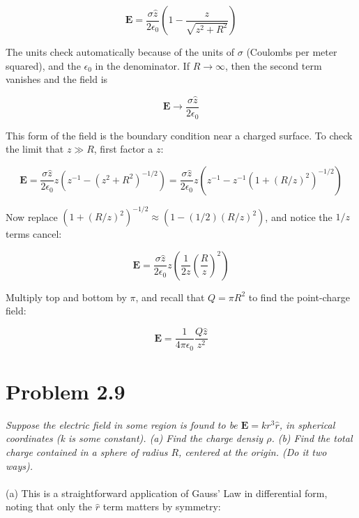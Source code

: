 \documentclass[10pt]{article}
\begin{document}
\begin{equation}
\mathbf{E} = \frac{\sigma \hat{z}}{2\epsilon_0}\left( 1 - \frac{z}{\sqrt{z^2 + R^2}}\right)
\end{equation}

The units check automatically because of the units of $\sigma$ (Coulombs per meter squared), and the $\epsilon_0$ in the denominator.  If $R \to \infty$, then the second term vanishes and the field is 

\begin{equation}
\mathbf{E} \to \frac{\sigma \hat{z}}{2\epsilon_0}
\end{equation}

This form of the field is the boundary condition near a charged surface.  To check the limit that $z \gg R$, first factor a $z$:

\begin{equation}
\mathbf{E} = \frac{\sigma \hat{z}}{2\epsilon_0} z \left( z^{-1} - (z^2 + R^2)^{-1/2}\right) = \frac{\sigma \hat{z}}{2\epsilon_0} z \left( z^{-1} - z^{-1} (1 + (R/z)^2)^{-1/2}\right)
\end{equation}

Now replace $(1+(R/z)^2)^{-1/2} \approx (1 - (1/2) (R/z)^2)$, and notice the $1/z$ terms cancel:

\begin{equation}
\mathbf{E} = \frac{\sigma \hat{z}}{2\epsilon_0}z\left( \frac{1}{2z} \left(\frac{R}{z}\right)^2 \right)
\end{equation}

Multiply top and bottom by $\pi$, and recall that $Q = \pi R^2$ to find the point-charge field:

\begin{equation}
\mathbf{E} = \frac{1}{4\pi\epsilon_0} \frac{Q \hat{z}}{z^2}
\end{equation}

\section{Problem 2.9}

\textit{Suppose the electric field in some region is found to be $\mathbf{E} = k r^3 \hat{r}$, in spherical coordinates (k is some constant). (a) Find the charge densiy $\rho$. (b) Find the total charge contained in a sphere of radius $R$, centered at the origin. (Do it two ways).} \\ \\

(a) This is a straightforward application of Gauss' Law in differential form, noting that only the $\hat{r}$ term matters by symmetry:
\end{document}
